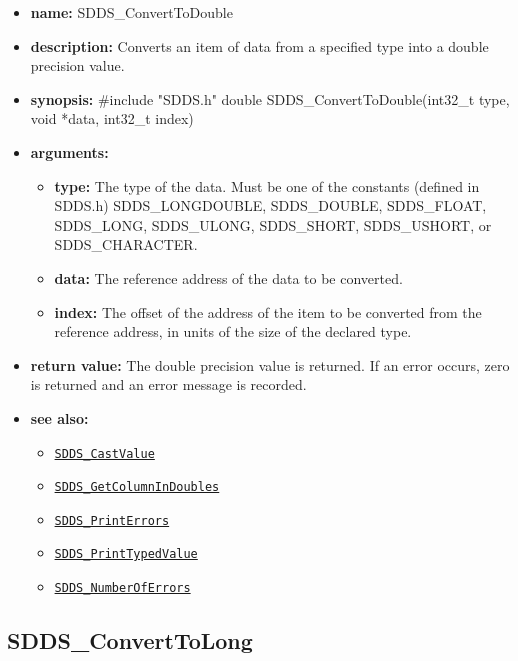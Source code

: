 \documentclass[11pt]{article}
\newcommand{\progref}[1]{\hyperref[SDDS_#1]{\tt SDDS\_#1}}
\begin{document}
\begin{itemize}
\item {\bf name:}\newline
SDDS\_ConvertToDouble
\item {\bf description:}\newline
Converts an item of data from a specified type into a double precision value.
\item {\bf synopsis:} \#include "SDDS.h"\newline
double SDDS\_ConvertToDouble(int32\_t type, void *data, int32\_t index)
\item {\bf arguments:}
\begin{itemize}
\item {\bf type:} The type of the data. Must be one of the constants (defined in SDDS.h) SDDS\_LONGDOUBLE, SDDS\_DOUBLE, SDDS\_FLOAT, SDDS\_LONG, SDDS\_ULONG, SDDS\_SHORT, SDDS\_USHORT, or SDDS\_CHARACTER.
\item {\bf data:} The reference address of the data to be converted.
\item {\bf index:} The offset of the address of the item to be converted from the reference address, in units of the size of the declared type.
\end{itemize}
\item {\bf return value:}\newline
The double precision value is returned. If an error occurs, zero is returned and an error message is recorded.
\item {\bf see also:}
\begin{itemize}
\item \progref{CastValue}
\item \progref{GetColumnInDoubles}
\item \progref{PrintErrors}
\item \progref{PrintTypedValue}
\item \progref{NumberOfErrors}
\end{itemize}
\end{itemize}

\subsection{SDDS\_ConvertToLong}
\label{SDDS_ConvertToLong}
\end{document}
